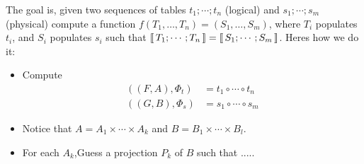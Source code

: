 The goal is, given two sequences of tables $t_1;\cdots;t_n$ (logical) and
$s_1;\cdots;s_m$ (physical) compute a function
$f(T_1,\ldots,T_n) = (S_1,\ldots,S_m)$, where $T_i$ populates $t_i$,
and $S_i$ populates $s_i$ such that
$\llbracket\,T_1;\cdots;T_n\,\rrbracket = \llbracket\,S_1;\cdots;S_m\,\rrbracket$. Heres how we do it:
\begin{itemize}
\item Compute
  \begin{align*}
    ((F,A),\Phi_t) &= t_1 \circ \cdots \circ t_n\\
    ((G,B),\Phi_s) &= s_1 \circ \cdots \circ s_m
  \end{align*}
\item Notice that $A = A_1\times \cdots \times A_k $ and
  $B = B_1 \times \cdots \times B_l$.
\item For each $A_k$,Guess a projection $P_k$ of $B$ such that .....
\end{itemize}



